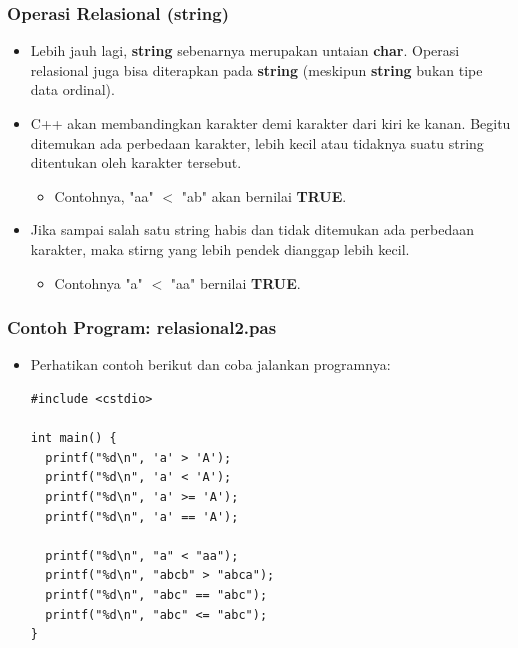 \begin{frame}
\frametitle{Operasi Relasional (string)}
\begin{itemize}
  \item Lebih jauh lagi, \textbf{string} sebenarnya merupakan untaian \textbf{char}. Operasi relasional juga bisa diterapkan pada \textbf{string} (meskipun \textbf{string} bukan tipe data ordinal).
  \item C++ akan membandingkan karakter demi karakter dari kiri ke kanan. Begitu ditemukan ada perbedaan karakter, lebih kecil atau tidaknya suatu string ditentukan oleh karakter tersebut.
  \begin{itemize}
    \item Contohnya, "aa" $<$ "ab" akan bernilai \textbf{TRUE}.
  \end{itemize}
  \item Jika sampai salah satu string habis dan tidak ditemukan ada perbedaan karakter, maka stirng yang lebih pendek dianggap lebih kecil.
  \begin{itemize}
    \item Contohnya "a" $<$ "aa" bernilai \textbf{TRUE}.
  \end{itemize}
\end{itemize}
\end{frame}

\begin{frame}[fragile]
\frametitle{Contoh Program: relasional2.pas}
\begin{itemize}
  \item Perhatikan contoh berikut dan coba jalankan programnya:
\begin{lstlisting}
#include <cstdio>

int main() {
  printf("%d\n", 'a' > 'A');
  printf("%d\n", 'a' < 'A');
  printf("%d\n", 'a' >= 'A');
  printf("%d\n", 'a' == 'A');

  printf("%d\n", "a" < "aa");
  printf("%d\n", "abcb" > "abca");
  printf("%d\n", "abc" == "abc");
  printf("%d\n", "abc" <= "abc");
}
\end{lstlisting}
\end{itemize}
\end{frame}

